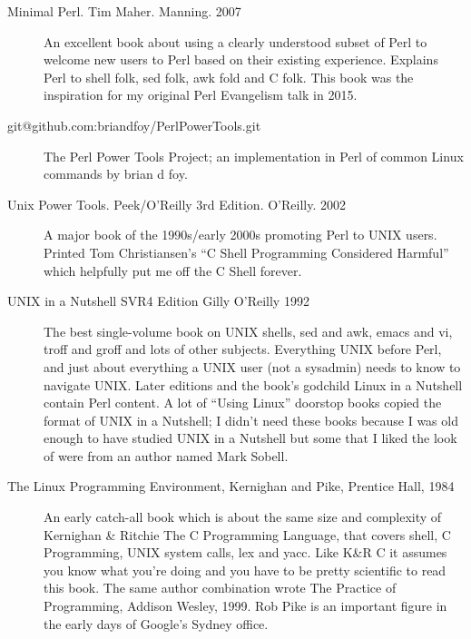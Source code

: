 \documentclass{article}
\begin{document}
\begin{description}

\item[Minimal Perl. Tim Maher. Manning. 2007] An excellent book about
  using a clearly understood subset of Perl to welcome new users to
  Perl based on their existing experience. Explains Perl to shell
  folk, sed folk, awk fold and C folk. This book was the inspiration
  for my original Perl Evangelism talk in 2015.

\item[git@github.com:briandfoy/PerlPowerTools.git] The Perl Power
  Tools Project; an implementation in Perl of common Linux commands by
  brian d foy.

\item[Unix Power Tools. Peek/O'Reilly 3rd Edition. O'Reilly. 2002] A
  major book of the 1990s/early 2000s promoting Perl to UNIX users.
  Printed Tom Christiansen's ``C Shell Programming Considered
  Harmful'' which helpfully put me off the C Shell forever.

\item[UNIX in a Nutshell SVR4 Edition Gilly O'Reilly 1992] The best
  single-volume book on UNIX shells, sed and awk, emacs and vi, troff
  and groff and lots of other subjects. Everything UNIX before Perl,
  and just about everything a UNIX user (not a sysadmin) needs to know
  to navigate UNIX. Later editions and the book's godchild Linux in a
  Nutshell contain Perl content. A lot of ``Using Linux'' doorstop
  books copied the format of UNIX in a Nutshell; I didn't need these
  books because I was old enough to have studied UNIX in a Nutshell
  but some that I liked the look of were from an author named Mark
  Sobell.

\item[The Linux Programming Environment, Kernighan and Pike, Prentice
  Hall, 1984] An early catch-all book which is about the same size and
  complexity   of Kernighan \& Ritchie The C Programming Language,
  that covers shell, C Programming, UNIX system calls, lex and
  yacc. Like K\&R C it assumes you know what you're doing and
  you have to be pretty scientific to read this book. The same author
  combination wrote The Practice of Programming, Addison Wesley,
  1999. Rob Pike is an important figure in the early days of Google's
  Sydney office.




\end{description}
\end{document}
